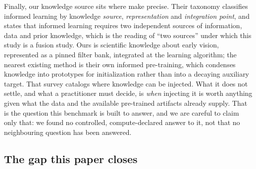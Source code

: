 Finally, our knowledge source sits where \citet{vonrueden2023informed} make
precise. Their taxonomy classifies informed learning by knowledge
\emph{source}, \emph{representation} and \emph{integration point}, and
states that informed learning requires two independent sources of
information, data and prior knowledge, which is the reading of ``two
sources'' under which this study is a fusion study. Ours is
scientific knowledge about early vision, represented as a pinned filter
bank, integrated at the learning algorithm; the nearest existing method is
their own informed pre-training, which
condenses knowledge into prototypes for initialization rather than into a
decaying auxiliary target. That survey catalogs where knowledge can be
injected. What it does not settle, and what a practitioner must decide, is
\emph{when} injecting it is worth anything given what the data and the
available pre-trained artifacts already supply. That is the question this
benchmark is built to answer, and we are careful to claim only that: we
found no controlled, compute-declared answer to it, not that no neighbouring
question has been answered.

\subsection{The gap this paper closes}\label{sec:gap}

